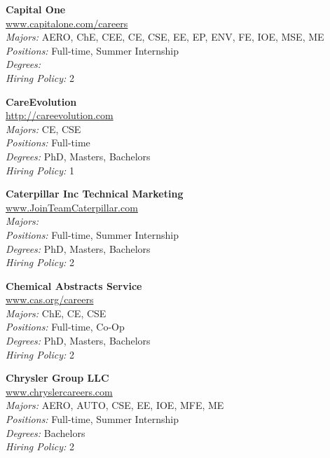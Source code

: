 \documentclass{article}
\begin{document}
\begin{center}
\begin{multicols}{3}
\begin{minipage}{.9\columnwidth}{\Large\bf Capital One }\\
	\url{www.capitalone.com/careers}\\
	\emph{Majors:} AERO, ChE, CEE, CE, CSE, EE, EP, ENV, FE, IOE, MSE, ME\\
	\emph{Positions:} Full-time, Summer Internship\\
	\emph{Degrees:} \\
	\emph{Hiring Policy:} 2\\
\end{minipage}
 
\begin{minipage}{.9\columnwidth}{\Large\bf CareEvolution }\\
	\url{http://careevolution.com}\\
	\emph{Majors:} CE, CSE\\
	\emph{Positions:} Full-time\\
	\emph{Degrees:} PhD, Masters, Bachelors\\
	\emph{Hiring Policy:} 1\\
\end{minipage}
 
\begin{minipage}{.9\columnwidth}{\Large\bf Caterpillar Inc Technical Marketing }\\
	\url{www.JoinTeamCaterpillar.com}\\
	\emph{Majors:} \\
	\emph{Positions:} Full-time, Summer Internship\\
	\emph{Degrees:} PhD, Masters, Bachelors\\
	\emph{Hiring Policy:} 2\\
\end{minipage}
 
\begin{minipage}{.9\columnwidth}{\Large\bf Chemical Abstracts Service }\\
	\url{www.cas.org/careers}\\
	\emph{Majors:} ChE, CE, CSE\\
	\emph{Positions:} Full-time, Co-Op\\
	\emph{Degrees:} PhD, Masters, Bachelors\\
	\emph{Hiring Policy:} 2\\
\end{minipage}
 
\begin{minipage}{.9\columnwidth}{\Large\bf Chrysler Group LLC }\\
	\url{www.chryslercareers.com}\\
	\emph{Majors:} AERO, AUTO, CSE, EE, IOE, MFE, ME\\
	\emph{Positions:} Full-time, Summer Internship\\
	\emph{Degrees:} Bachelors\\
	\emph{Hiring Policy:} 2\\
\end{minipage}
 

\end{multicols}
\end{center}
\end{document}
